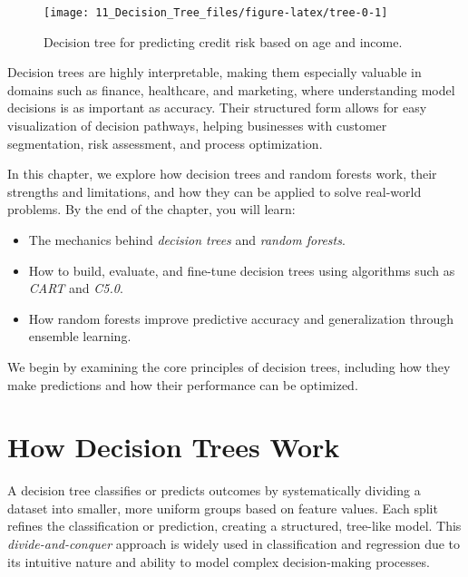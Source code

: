 \documentclass[
  11pt,
]{book}
\providecommand{\tightlist}{%
  \setlength{\itemsep}{0pt}\setlength{\parskip}{0pt}}
\theoremstyle{definition}
\theoremstyle{definition}
\theoremstyle{definition}
\theoremstyle{definition}
\theoremstyle{remark}
\begin{document}
\begin{figure}[H]

{\centering \texttt{[image: 11\_Decision\_Tree\_files/figure-latex/tree-0-1]} 

}

\caption{Decision tree for predicting credit risk based on age and income.}\label{fig:tree-0}
\end{figure}

Decision trees are highly interpretable, making them especially valuable in domains such as finance, healthcare, and marketing, where understanding model decisions is as important as accuracy. Their structured form allows for easy visualization of decision pathways, helping businesses with customer segmentation, risk assessment, and process optimization.

In this chapter, we explore how decision trees and random forests work, their strengths and limitations, and how they can be applied to solve real-world problems. By the end of the chapter, you will learn:

\begin{itemize}
\tightlist
\item
  The mechanics behind \emph{decision trees} and \emph{random forests}.\\
\item
  How to build, evaluate, and fine-tune decision trees using algorithms such as \emph{CART} and \emph{C5.0}.\\
\item
  How random forests improve predictive accuracy and generalization through ensemble learning.
\end{itemize}

We begin by examining the core principles of decision trees, including how they make predictions and how their performance can be optimized.

\section{How Decision Trees Work}\label{how-decision-trees-work}

A decision tree classifies or predicts outcomes by systematically dividing a dataset into smaller, more uniform groups based on feature values. Each split refines the classification or prediction, creating a structured, tree-like model. This \emph{divide-and-conquer} approach is widely used in classification and regression due to its intuitive nature and ability to model complex decision-making processes.
\end{document}
